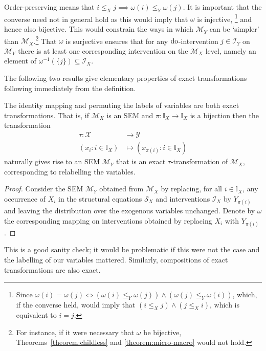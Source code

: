Order-preserving means that ${i \leq_X j \implies \omega(i) \leq_Y \omega(j)}$.
It is important that the converse need not in general hold as this would imply that $\omega$ is injective,%
\footnote{Since ${\omega(i)=\omega(j) \iff \left(\omega(i) \leq_Y \omega(j)\right) \land \left(\omega(j) \leq_Y \omega(i)\right)}$, which, if the converse held, would imply that $\left(i \leq_X j\right) \land \left(j \leq_X i\right)$, which is equivalent to $i=j$.}
and hence also bijective.
This would constrain the ways in which $\mathcal{M}_Y$ can be `simpler' than $\mathcal{M}_X$.\footnote{For instance, if it were necessary that $\omega$ be bijective, Theorems~\ref{theorem:childless} and \ref{theorem:micro-macro} would not hold.}
That $\omega$ is surjective ensures that for any $\operatorname{do}$-intervention $j \in \mathcal{I}_Y$ on $\mathcal{M}_Y$ there is at least one corresponding intervention on the $\mathcal{M}_X$ level, namely an element of $\omega^{-1}(\{j\}) \subseteq \mathcal{I}_X$.

The following two results give elementary properties of exact transformations following immediately from the definition.
\medskip

\begin{lemma}\label{lemma:elementary}
The identity mapping and permuting the labels of variables are both exact transformations.
That is, if $\mathcal{M}_X$ is an SEM and $\pi:\mathbb{I}_X \to \mathbb{I}_X$ is a bijection then the transformation
\begin{align*}
\tau:\mathcal{X}&\to\mathcal{Y}\\
(x_i:i\in\mathbb{I}_X) &\mapsto (x_{\pi(i)}:i\in\mathbb{I}_X)
\end{align*}
naturally gives rise to an SEM $\mathcal{M}_Y$ that is an exact $\tau$-transformation of $\mathcal{M}_X$, corresponding to relabelling the variables.
\end{lemma}

\begin{proof}
Consider the SEM $\mathcal{M}_Y$ obtained from $\mathcal{M}_X$ by replacing, for all $i\in\mathbb{I}_X$, any occurrence of $X_i$ in the structural equations $\mathcal{S}_X$ and interventions $\mathcal{I}_X$ by $Y_{\pi(i)}$ and leaving the distribution over the exogenous variables unchanged. Denote by $\omega$ the corresponding mapping on interventions obtained by replacing $X_i$ with $Y_{\pi(i)}$.
\end{proof}

This is a good sanity check; it would be problematic if this were not the case and the labelling of our variables mattered. Similarly, compositions of exact transformations are also exact.

